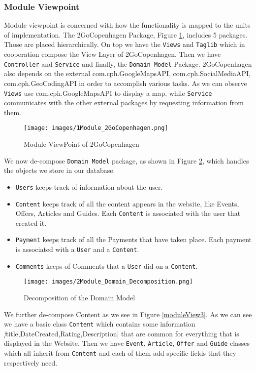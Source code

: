 \subsubsection{Module Viewpoint}
Module viewpoint is concerned with how the functionality is mapped to the units of implementation. 
The 2GoCopenhagen Package, Figure \ref{moduleView1}, includes 5 packages. Those are placed hierarchically. On top we have the \verb|Views| and \verb|Taglib| which in cooperation compose the View Layer of 2GoCopenhagen. Then we have \verb|Controller| and \verb|Service| and finally, the \verb|Domain Model| Package. 2GoCopenhagen also depends on the external com.cph.GoogleMapsAPI, com.cph.SocialMediaAPI, com.cph.GeoCodingAPI in order to accomplish various tasks. As we can observe \verb|Views| use com.cph.GoogleMapsAPI to display a map, while \verb|Service| communicates with the other external packages by requesting information from them.   
\begin{figure}[H]
	\centering
	\texttt{[image: images/1Module\_2GoCopenhagen.png]}
	\caption{Module ViewPoint of 2GoCopenhagen}
	\label{moduleView1}
\end{figure}


We now de-compose \verb|Domain Model| package, as shown in Figure \ref{moduleView2}, which handles the objects we store in our database.
\begin{itemize}
	\item \verb|Users| keeps track of information about the user.
	\item \verb|Content| keeps track of all the content appears in the website, like Events, Offers, Articles and Guides. Each \verb|Content| is associated with the user that created it.
	\item \verb|Payment| keeps track of all the Payments that have taken place. Each payment is associated with a \verb|User| and a \verb|Content|.
	\item \verb|Comments| keeps of Comments that a \verb|User| did on a \verb|Content|.
\end{itemize}

\begin{figure}[H]
	\centering
	\texttt{[image: images/2Module\_Domain\_Decomposition.png]}
	\caption{Decomposition of the Domain Model}
	\label{moduleView2}
\end{figure}

We further de-compose Content as we see in Figure \ref{moduleView3}. As we can see we have a basic class \verb|Content| which contains some information \emph|title,DateCreated,Rating,Description| that are common for everything that is displayed in the Website. Then we have \verb|Event|, \verb|Article|, \verb|Offer| and \verb|Guide| classes which all inherit from \verb|Content| and each of them add specific fields that they respectively need. 

